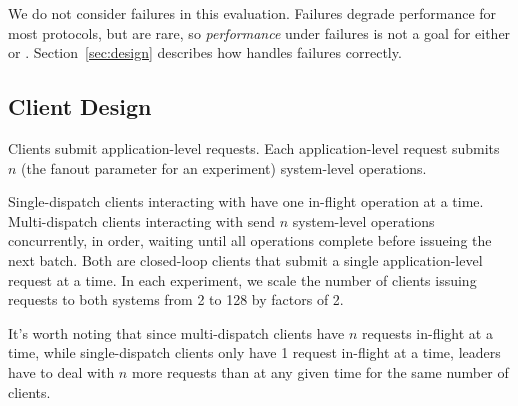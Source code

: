 We do not consider failures in this evaluation. Failures degrade performance for
most protocols, but are rare, so \emph{performance} under failures is not a goal
for either \mpaxos or \system. Section~\ref{sec:design} describes how \system{}
handles failures correctly.



\subsection{Client Design}
Clients submit application-level requests. Each application-level request
submits $n$ (the fanout parameter for an experiment) system-level operations.

Single-dispatch clients interacting with \mpaxos have one in-flight operation at
a time. Multi-dispatch clients interacting with \system send $n$ system-level
operations concurrently, in order, waiting until all operations complete before
issueing the next batch. Both are closed-loop clients that submit a single
application-level request at a time.
In each experiment, we scale the number of clients issuing requests to both
systems from 2 to 128 by factors of 2.

It's worth noting that since multi-dispatch clients have $n$ requests in-flight at a time, while single-dispatch clients only have 1 request in-flight at a time, \system leaders have to deal with $n$ more requests than \mpaxos at any given time for the same number of clients.



%

